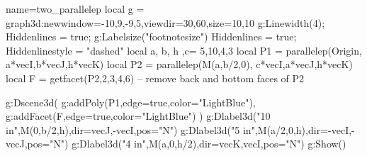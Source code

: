 \documentclass[12pt]{standalone}
\begin{document}
\begin{luadraw}{name=two_parallelep}
local g = graph3d:new{window={-10,9,-9,5},viewdir={30,60},size={10,10}}
g:Linewidth(4); Hiddenlines = true; g:Labelsize("footnotesize")
Hiddenlines = true; Hiddenlinestyle = "dashed"
local a, b, h ,c= 5,10,4,3
local P1 = parallelep(Origin, a*vecI,b*vecJ,h*vecK)
local P2 = parallelep(M(a,b/2,0), c*vecI,a*vecJ,h*vecK)
local F = getfacet(P2,{2,3,4,6}) -- remove back and bottom faces of P2

g:Dscene3d(
g:addPoly(P1,{edge=true,color="LightBlue"}),
g:addFacet(F,{edge=true,color="LightBlue"})
)
g:Dlabel3d("10 in",M(0,b/2,h),{dir={vecJ,-vecI},pos="N"})
g:Dlabel3d("5 in",M(a/2,0,h),{dir={-vecI,-vecJ},pos="N"})
g:Dlabel3d("4 in",M(a,0,h/2),{dir={vecK,vecI},pos="N"})
g:Show()
\end{luadraw}
\end{document}
